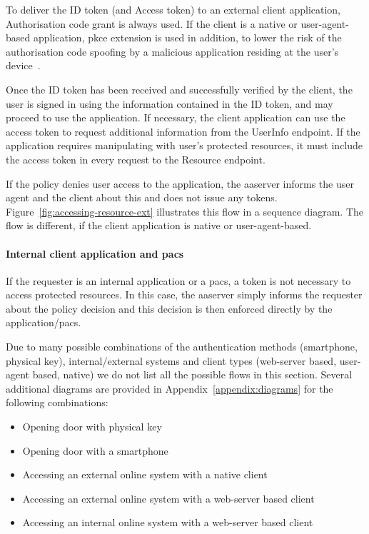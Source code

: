 To deliver the ID token (and Access token) to an external client application, Authorisation code grant is always used. If the client is a native or user-agent-based application, \acrshort{pkce} extension is used in addition, to lower the risk of the authorisation code spoofing by a malicious application residing at the user's device~\cite{Sakimura2015ProofClients}.

Once the ID token has been received and successfully verified by the client, the user is signed in using the information contained in the ID token, and may proceed to use the application. If necessary, the client application can use the access token to request additional information from the UserInfo endpoint. If the application requires manipulating with user's protected resources, it must include the access token in every request to the Resource endpoint.

If the policy denies user access to the application, the \acrshort{aaserver} informs the user agent and the client about this and does not issue any tokens. Figure~\ref{fig:accessing-resource-ext} illustrates this flow in a sequence diagram. The flow is different, if the client application is native or user-agent-based.

\paragraph{Internal client application and \acrshort{pacs}}
If the requester is an internal application or a \acrshort{pacs}, a token is not necessary to access protected resources. In this case, the \acrshort{aaserver} simply informs the requester about the policy decision and this decision is then enforced directly by the application/\acrshort{pacs}.

\bigskip\noindent
Due to many possible combinations of the authentication methods (smartphone, physical key), internal/external systems and client types (web-server based, user-agent based, native) we do not list all the possible flows in this section. Several additional diagrams are provided in Appendix~\ref{appendix:diagrams} for the following combinations:
\begin{itemize}[noitemsep, nolistsep]
    \item Opening door with physical key
    \item Opening door with a smartphone
    \item Accessing an external online system with a native client
    \item Accessing an external online system with a web-server based client
    \item Accessing an internal online system with a web-server based client
\end{itemize}

